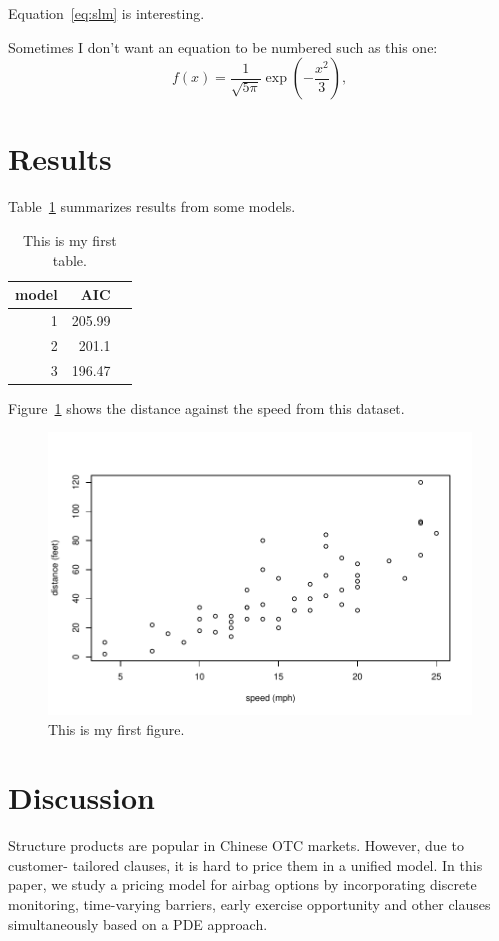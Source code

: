 \documentclass[12pt]{article}
\begin{document}
Equation~\eqref{eq:slm} is interesting.

Sometimes I don't want an equation to be numbered such as this one:
\[
  f(x) = \frac{1}{\sqrt{5\pi}} \exp\left( - \frac{x^2}{3} \right),
\]



\section{Results}
\label{sec:resu}

Table~\ref{tab:aic} summarizes results from some models.

\begin{table}[tbp]
  \caption{This is my first table.}
  \label{tab:aic}
\centering
\begin{tabular}{rrr}
  \toprule
model & AIC \\ 
  \midrule
  1 & 205.99 \\ 
  2 & 201.1 \\ 
  3 & 196.47 \\ 
   \bottomrule
\end{tabular}
\end{table}

Figure~\ref{fig:cars} shows the distance against the speed from this dataset.


\begin{figure}[tbp]
  \centering
  \includegraphics[width=\textwidth]{cars.pdf}
  \caption{This is my first figure.}
  \label{fig:cars}
\end{figure}

\section{Discussion}
\label{sec:disc}

  Structure products are popular in Chinese OTC markets. However, due to 
customer- tailored clauses, it is hard to price them in a unified model. 
In this paper, we study a pricing model for airbag options by incorporating 
discrete monitoring, time-varying barriers, early exercise opportunity and 
other clauses simultaneously based on a PDE approach.



\end{document}
